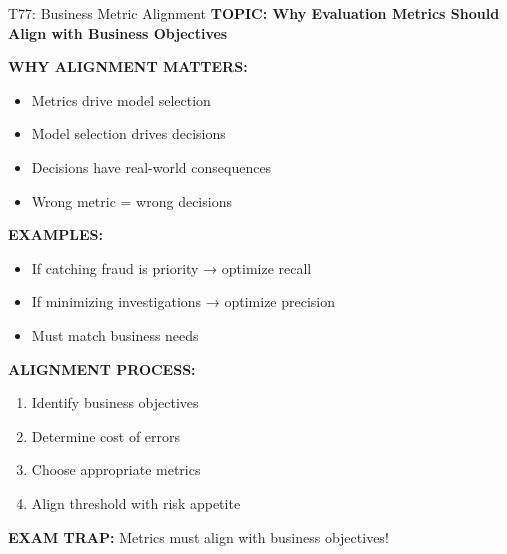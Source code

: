 \documentclass[8pt]{beamer}
\begin{document}
	\begin{frame}{T77: Business Metric Alignment}
		\fontsize{6.5}{7.5}\selectfont
		\textbf{TOPIC: Why Evaluation Metrics Should Align with Business Objectives}
		
		\vspace{0.1cm}
		\textbf{WHY ALIGNMENT MATTERS:}
		\begin{itemize}
			\item Metrics drive model selection
			\item Model selection drives decisions
			\item Decisions have real-world consequences
			\item Wrong metric = wrong decisions
		\end{itemize}
		
		\vspace{0.1cm}
		\textbf{EXAMPLES:}
		\begin{itemize}
			\item If catching fraud is priority → optimize recall
			\item If minimizing investigations → optimize precision
			\item Must match business needs
		\end{itemize}
		
		\vspace{0.1cm}
		\textbf{ALIGNMENT PROCESS:}
		\begin{enumerate}
			\item Identify business objectives
			\item Determine cost of errors
			\item Choose appropriate metrics
			\item Align threshold with risk appetite
		\end{enumerate}
		
		\textcolor{myred}{\textbf{EXAM TRAP:}} Metrics must \textcolor{myblue}{align with business objectives}!
	\end{frame}
	
\end{document}
